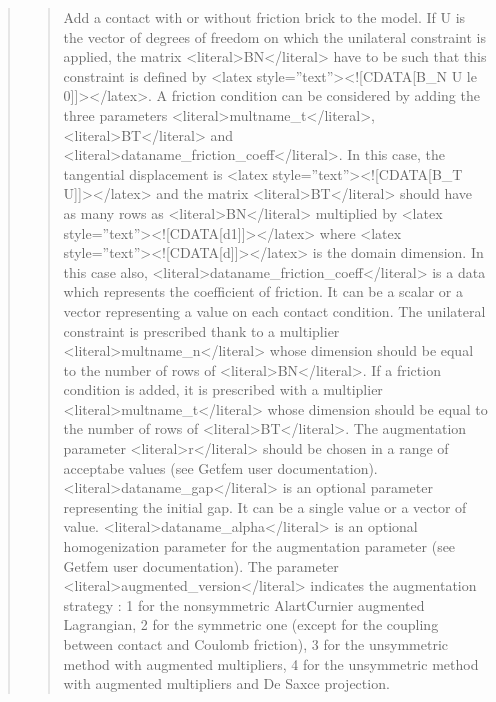 \documentclass[a4paper,11pt,english]{sphinxmanual}
\begin{document}
\begin{quote}
\begin{quote}
\sphinxAtStartPar
Add a contact with or without friction brick to the model.
If U is the vector
of degrees of freedom on which the unilateral constraint is applied,
the matrix \textless{}literal\textgreater{}BN\textless{}/literal\textgreater{} have to be such that this constraint is defined by
\textless{}latex style=”text”\textgreater{}\textless{}!{[}CDATA{[}B\_N U le 0{]}{]}\textgreater{}\textless{}/latex\textgreater{}. A friction condition can be considered by adding
the three parameters \textless{}literal\textgreater{}multname\_t\textless{}/literal\textgreater{}, \textless{}literal\textgreater{}BT\textless{}/literal\textgreater{} and \textless{}literal\textgreater{}dataname\_friction\_coeff\textless{}/literal\textgreater{}.
In this case, the tangential displacement is \textless{}latex style=”text”\textgreater{}\textless{}!{[}CDATA{[}B\_T U{]}{]}\textgreater{}\textless{}/latex\textgreater{} and
the matrix \textless{}literal\textgreater{}BT\textless{}/literal\textgreater{} should have as many rows as \textless{}literal\textgreater{}BN\textless{}/literal\textgreater{} multiplied by
\textless{}latex style=”text”\textgreater{}\textless{}!{[}CDATA{[}d\sphinxhyphen{}1{]}{]}\textgreater{}\textless{}/latex\textgreater{} where \textless{}latex style=”text”\textgreater{}\textless{}!{[}CDATA{[}d{]}{]}\textgreater{}\textless{}/latex\textgreater{} is the domain dimension.
In this case also, \textless{}literal\textgreater{}dataname\_friction\_coeff\textless{}/literal\textgreater{} is a data which represents
the coefficient of friction. It can be a scalar or a vector representing a
value on each contact condition.  The unilateral constraint is prescribed
thank to a multiplier
\textless{}literal\textgreater{}multname\_n\textless{}/literal\textgreater{} whose dimension should be equal to the number of rows of
\textless{}literal\textgreater{}BN\textless{}/literal\textgreater{}. If a friction condition is added, it is prescribed with a
multiplier \textless{}literal\textgreater{}multname\_t\textless{}/literal\textgreater{} whose dimension should be equal to the number
of rows of \textless{}literal\textgreater{}BT\textless{}/literal\textgreater{}. The augmentation parameter \textless{}literal\textgreater{}r\textless{}/literal\textgreater{} should be chosen in
a range of
acceptabe values (see Getfem user documentation). \textless{}literal\textgreater{}dataname\_gap\textless{}/literal\textgreater{} is an
optional parameter representing the initial gap. It can be a single value
or a vector of value. \textless{}literal\textgreater{}dataname\_alpha\textless{}/literal\textgreater{} is an optional homogenization
parameter for the augmentation parameter
(see Getfem user documentation).  The parameter \textless{}literal\textgreater{}augmented\_version\textless{}/literal\textgreater{}
indicates the augmentation strategy : 1 for the non\sphinxhyphen{}symmetric
Alart\sphinxhyphen{}Curnier augmented Lagrangian, 2 for the symmetric one (except for
the coupling between contact and Coulomb friction), 3 for the
unsymmetric method with augmented multipliers, 4 for the unsymmetric
method with augmented multipliers and De Saxce projection.
\end{quote}


\end{quote}
\end{document}
